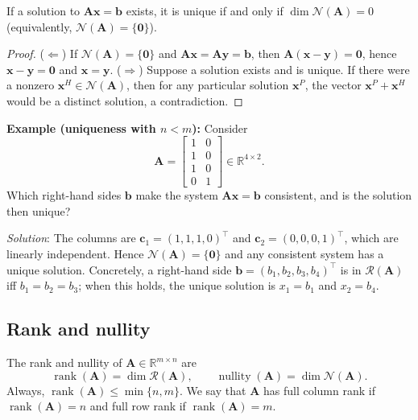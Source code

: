 \begin{theoremBox}
\begin{theorem}
If a solution to $\mathbf{A}\mathbf{x}=\mathbf{b}$ exists, it is unique if and only if $\dim\mathcal{N}(\mathbf{A})=0$ (equivalently, $\mathcal{N}(\mathbf{A})=\{\mathbf{0}\}$).
\end{theorem}
\begin{proof}
($\Leftarrow$) If $\mathcal{N}(\mathbf{A})=\{\mathbf{0}\}$ and $\mathbf{A}\mathbf{x}=\mathbf{A}\mathbf{y}=\mathbf{b}$, then $\mathbf{A}(\mathbf{x}-\mathbf{y})=\mathbf{0}$, hence $\mathbf{x}-\mathbf{y}=\mathbf{0}$ and $\mathbf{x}=\mathbf{y}$.
($\Rightarrow$) Suppose a solution exists and is unique. If there were a nonzero $\mathbf{x}^{H}\in\mathcal{N}(\mathbf{A})$, then for any particular solution $\mathbf{x}^{P}$, the vector $\mathbf{x}^{P}+\mathbf{x}^{H}$ would be a distinct solution, a contradiction.
\end{proof}
\end{theoremBox}

\begin{exampleBox}
\textbf{Example (uniqueness with $n<m$):} Consider
\[
\mathbf{A}=\begin{bmatrix}
1&0\\ 1&0\\ 1&0\\ 0&1
\end{bmatrix}\in\mathbb{R}^{4\times 2}.
\]
Which right-hand sides $\mathbf{b}$ make the system $\mathbf{A}\mathbf{x} = \mathbf{b}$ consistent, and is the solution then unique?

\emph{Solution}: The columns are $\mathbf{c}_1=(1,1,1,0)^{\top}$ and $\mathbf{c}_2=(0,0,0,1)^{\top}$, which are linearly independent. Hence $\mathcal{N}(\mathbf{A})=\{\mathbf{0}\}$ and any consistent system has a unique solution. Concretely, a right-hand side $\mathbf{b}=(b_1,b_2,b_3,b_4)^{\top}$ is in $\mathcal{R}(\mathbf{A})$ iff $b_1=b_2=b_3$; when this holds, the unique solution is $x_1=b_1$ and $x_2=b_4$.
\end{exampleBox}

\subsection{Rank and nullity} The rank and nullity of $\mathbf{A}\in\mathbb{R}^{m\times n}$ are
\[
\operatorname{rank}(\mathbf{A})=\dim\mathcal{R}(\mathbf{A}),
\qquad
\operatorname{nullity}(\mathbf{A})=\dim\mathcal{N}(\mathbf{A}).
\]
Always, $\operatorname{rank}(\mathbf{A})\le \min\{n,m\}$. We say that $\mathbf{A}$ has full column rank if $\operatorname{rank}(\mathbf{A})=n$ and full row rank if $\operatorname{rank}(\mathbf{A})=m$.

